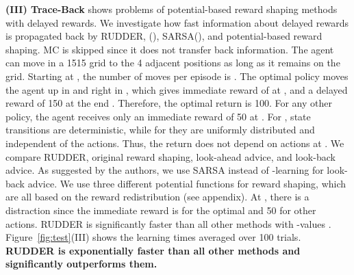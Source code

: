 \documentclass{article}
\begin{document}
{\bf (III) Trace-Back} 
shows problems of potential-based reward shaping methods
with delayed rewards.
We investigate how fast information about delayed rewards 
is propagated back by
RUDDER, (), SARSA(), 
and potential-based reward shaping.
MC is skipped since it does not 
transfer back information.
The agent can move in a 1515 grid
to the 4 adjacent positions as long as it remains on the grid.
Starting at , the number of moves per episode is . 
The optimal policy moves the agent up in  and  
right in , 
which gives immediate reward of  at , 
and a delayed reward of 150 at the end . 
Therefore, the optimal return is 100.
For any other policy, 
the agent receives only an immediate reward of 50 at .
For , state transitions are deterministic, while
for  they are uniformly distributed and 
independent of the actions.
Thus, the return does not depend on actions at .
We compare RUDDER, original reward shaping, 
look-ahead advice, and look-back advice. 
As suggested by the authors, we use SARSA instead of -learning 
for look-back advice. 
We use three different potential functions for reward shaping,
which are all based on the reward redistribution 
(see appendix). 
At , there is a distraction since the immediate 
reward is  for the optimal and 50 for other actions. 
RUDDER is significantly faster than all other methods
with -values .
Figure~\ref{fig:test}(III) shows the 
learning times averaged over 100 trials.
{\bf RUDDER is exponentially faster than 
all other methods and significantly outperforms them.}
\end{document}
